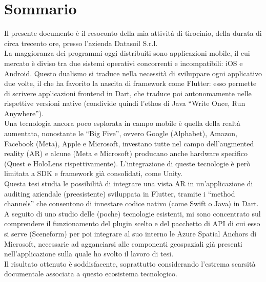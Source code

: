 
\cleardoublepage
{}
{}
\begingroup
\let\clearpage\relax
\let\cleardoublepage\relax
\let\cleardoublepage\relax

\chapter*{Sommario}

Il presente documento è il resoconto della mia attività di tirocinio, della durata di circa trecento ore, presso l'azienda Datasoil S.r.l.\\
La maggioranza dei programmi oggi distribuiti sono applicazioni mobile, il cui mercato è diviso tra due sistemi operativi concorrenti e incompatibili: iOS e Android. Questo dualismo si traduce nella necessità di sviluppare ogni applicativo due volte, il che ha favorito la nascita di framework come Flutter: esso permette di scrivere applicazioni frontend in Dart, che traduce poi autonomamente nelle rispettive versioni native (condivide quindi l’ethos di Java “Write Once, Run Anywhere”). \\
Una tecnologia ancora poco esplorata in campo mobile è quella della realtà aumentata, nonostante le “Big Five”, ovvero Google (Alphabet), Amazon, Facebook (Meta), Apple e Microsoft, investano tutte nel campo dell’augmented reality (AR) e alcune (Meta e Microsoft) producano anche hardware specifico (Quest e HoloLens rispettivamente). L’integrazione di queste tecnologie è però limitata a SDK e framework già consolidati, come Unity.\\ 
Questa tesi studia le possibilità di integrare una vista AR in un’applicazione di auditing aziendale (preesistente) sviluppata in Flutter, tramite i “method channels” che consentono di innestare codice nativo (come Swift o Java) in Dart. \\
A seguito di uno studio delle (poche) tecnologie esistenti, mi sono concentrato sul comprendere il funzionamento del plugin scelto e del pacchetto di API di cui esso si serve (Sceneform) per poi integrare al suo interno le Azure Spatial Anchors di Microsoft, necessarie ad agganciarsi alle componenti geospaziali già presenti nell’applicazione sulla quale ho svolto il lavoro di tesi. \\
Il risultato ottenuto è soddisfacente, soprattutto considerando l’estrema scarsità documentale associata a questo ecosistema tecnologico.
